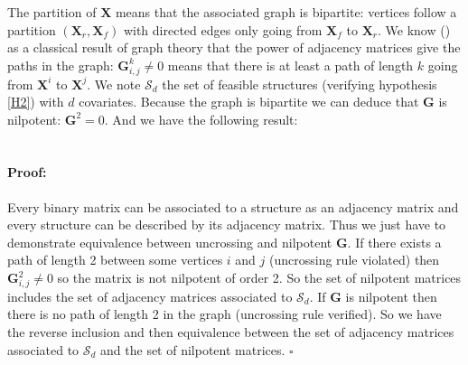 \documentclass[12pt,a4paper]{report}
\begin{document}
	The partition of $\boldsymbol{X}$ means that the associated graph is bipartite: vertices follow a partition $(\boldsymbol{X}_r,\boldsymbol{X}_f)$ with directed edges only going from $\boldsymbol{X}_f$ to $\boldsymbol{X}_r$.
	We know (\cite{biggs1993algebraic}) as a classical result of graph theory that the power of adjacency matrices give the paths in the graph: $\boldsymbol{G}^k_{i,j}\neq 0$ means that there is at least a path of length $k$ going from $\boldsymbol{X}^i$ to $\boldsymbol{X}^j$. We note $\mathcal{S}_d$ the set of feasible structures (verifying hypothesis \ref{H2}) with $d$ covariates. Because the graph is bipartite we can deduce that $\boldsymbol{G}$ is nilpotent: $\boldsymbol{G}^2=0$. And we have the following result:\\
	\\
	\paragraph{Proof:} Every binary matrix can be associated to a structure as an adjacency matrix and every structure can be described by its adjacency matrix. Thus we just have to demonstrate equivalence between uncrossing and nilpotent $\boldsymbol{G}$. If there exists a path of length 2 between some vertices $i$ and $j$ (uncrossing rule violated) then $\boldsymbol{G}^2_{i,j}\neq 0$ so the matrix is not nilpotent of order 2. So the set of nilpotent matrices includes the set of adjacency matrices associated to $\mathcal{S}_d$. If $\boldsymbol{G}$ is nilpotent then there is no path of length 2 in the graph (uncrossing rule verified). So we have the reverse inclusion and then equivalence between the set of adjacency matrices associated to $\mathcal{S}_d$ and the set of nilpotent matrices. $\square$\\
	
\end{document}
